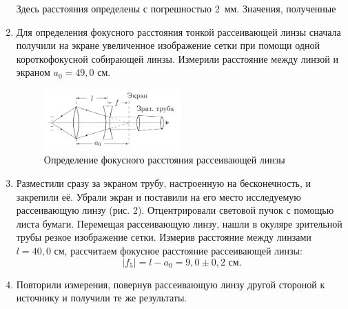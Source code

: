 \documentclass[a4paper, 12pt]{article}%
\begin{document}
\begin{enumerate}
		Здесь расстояния определены с погрешностью 2~мм. Значения, полученные 
		
		\item Для определения фокусного расстояния тонкой рассеивающей линзы сначала получили на экране увеличенное изображение сетки при помощи одной короткофокусной собирающей линзы. Измерили расстояние между линзой и экраном $a_0 = 49{,}0$ см.
									
		\begin{figure}
			\begin{center}
				\includegraphics[width = 0.5\textwidth]{pic/412-2.png}
				\caption{Определение фокусного расстояния рассеивающей линзы}
			\end{center}
		\end{figure}
	
		\item Разместили сразу за экраном трубу, настроенную на бесконечность, и закрепили её. Убрали экран и поставили на его место исследуемую рассеивающую линзу (рис. 2). Отцентрировали световой пучок с помощью листа бумаги. Перемещая рассеивающую линзу, нашли в окуляре зрительной трубы резкое изображение сетки. Измерив расстояние между линзами $l = 40{,}0$ см, рассчитаем фокусное расстояние рассеивающей линзы:
		\begin{equation*}
		|f_5| = l - a_0 = 9{,}0\pm0{,}2\text{ см}.
		\end{equation*}
		
		\item Повторили измерения, повернув рассеивающую линзу другой стороной к источнику и получили те же результаты.
	\end{enumerate}
\end{document}
